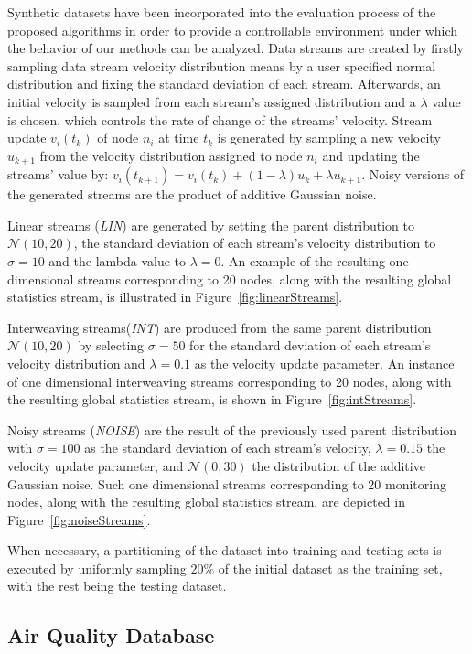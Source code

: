 Synthetic datasets have been incorporated into the evaluation process of the proposed algorithms in order to provide a controllable environment under which the behavior of our methods can be analyzed. Data streams are created by firstly sampling data stream velocity distribution means by a user specified normal distribution and fixing the standard deviation of each stream. Afterwards, an initial velocity is sampled from each stream's assigned distribution and a $\lambda$ value is chosen, which controls the rate of change of the streams' velocity. Stream update $v_i(t_k)$ of node $n_i$ at time $t_k$ is generated by sampling a new velocity $u_{k+1}$ from the velocity distribution assigned to node $n_i$ and updating the streams' value by: $v_i(t_{k+1})=v_i(t_k) + (1-\lambda)u_{k} + \lambda u_{k+1}$. Noisy versions of the generated streams are the product of additive Gaussian noise.

Linear streams (\emph{LIN}) are generated by setting the parent distribution to $\mathcal{N}(10,20)$, the standard deviation of each stream's velocity distribution to $\sigma=10$ and the lambda value to $\lambda=0$. An example of the resulting one dimensional streams corresponding to 20 nodes, along with the resulting global statistics stream, is illustrated in Figure~\ref{fig:linearStreams}.

Interweaving streams(\emph{INT}) are produced from the same parent distribution $\mathcal{N}(10,20)$ by selecting $\sigma=50$ for the standard deviation of each stream's velocity distribution and $\lambda=0.1$ as the velocity update parameter. An instance of one dimensional interweaving streams corresponding to 20 nodes, along with the resulting global statistics stream, is shown in Figure~\ref{fig:intStreams}.

Noisy streams (\emph{NOISE}) are the result of the previously used parent distribution with $\sigma=100$ as the standard deviation of each stream's velocity, $\lambda=0.15$ the velocity update parameter, and  $\mathcal{N}(0,30)$ the distribution of the additive Gaussian noise. Such one dimensional streams corresponding to 20 monitoring nodes, along with the resulting global statistics stream, are depicted in Figure~\ref{fig:noiseStreams}.

When necessary, a partitioning of the dataset into training and testing sets is executed by uniformly sampling $20\%$ of the initial dataset as the training set, with the rest being the testing dataset.

\subsection{Air Quality Database}

